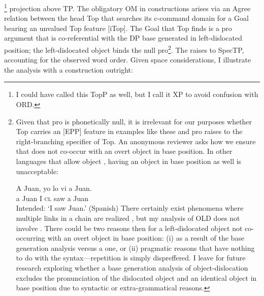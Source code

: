 \documentclass[output=paper,newtxmath,modfonts,nonflat,hidelinks]{langsci/langscibook}
\begin{document}
\footnote{I could have called this TopP as well, but I call it XP to avoid confusion with ORD.} {projection above TP. The obligatory OM in  constructions arises via an Agree relation between the head Top that searches its c-command domain for a Goal bearing an unvalued Top feature [iTop]. The Goal that Top finds is a} pro {argument that is co-referential with the DP base generated in left-dislocated position; the left-dislocated object binds the null} pro\footnote{Given that pro is phonetically null, it is irrelevant for our purposes whether Top carries an [EPP] feature in examples like these and pro raises to the right-branching specifier of Top. An anonymous reviewer asks how we ensure that  does not co-occur with an overt object in base position. In other languages that allow object , having an object in base position as well is unacceptable:

\ea
	\gll  *A Juan, yo lo  vi     a Juan. \\
	 a  Juan  I    \textsc{cl} saw a Juan \\
	 \glt  Intended: ‘I saw Juan.’ (Spanish)
\z
There certainly exist phenomena where multiple links in a chain are realized \citep{Nunes2004}, but my analysis of OLD does not involve . There could be two reasons then for a left-dislocated object not co-occurring with an overt object in base position: (i) as a result of the base generation analysis versus a  one, or (ii) pragmatic reasons that have nothing to do with the syntax—repetition is simply dispreffered. I leave for future research exploring whether a base generation analysis of object-dislocation excludes the pronunciation of the dislocated object and an identical object in base position due to syntactic or extra-grammatical reasons.}{. The  raises to SpecTP, accounting for the observed word order. Given space considerations, I illustrate the analysis with a  construction outright:}
\end{document}
